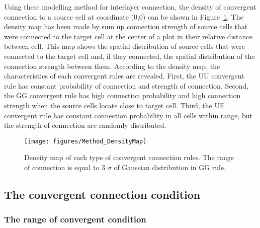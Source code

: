 \begin{enumerate}
\begin{enumerate}
      \end{enumerate}
   \end{enumerate}

Using these modelling method for interlayer connection, the density of convergent connection to a source cell at coordinate (0,0) can be shown in Figure~\ref{fig:DenseMap}. The density map has been made by sum up connection strength of source cells that were connected to the target cell at the center of a plot in their relative distance between cell. This map shows the spatial distribution of source cells that were connected to the target cell and, if they connected, the spatial distribution of the connection strength between them. According to the density map, the characteristics of each convergent rules are revealed. First, the UU convergent rule has constant probability of connection and strength of connection. Second, the GG convergent rule has high connection probability and high connection strength when the source cells locate close to target cell. Third, the UE convergent rule has constant connection probability in all cells within range, but the strength of connection are randomly distributed.



\begin{figure}[!h]
	\centering
	\texttt{[image: figures/Method\_DensityMap]}
	\caption{Density map of each type of convergent connection rules. The range of connection is equal to 3 $\sigma$ of Gaussian distribution in GG rule.}
	\label{fig:DenseMap}
\end{figure} 


\subsection{The convergent connection condition}
\subsubsection{The range of convergent condition}

